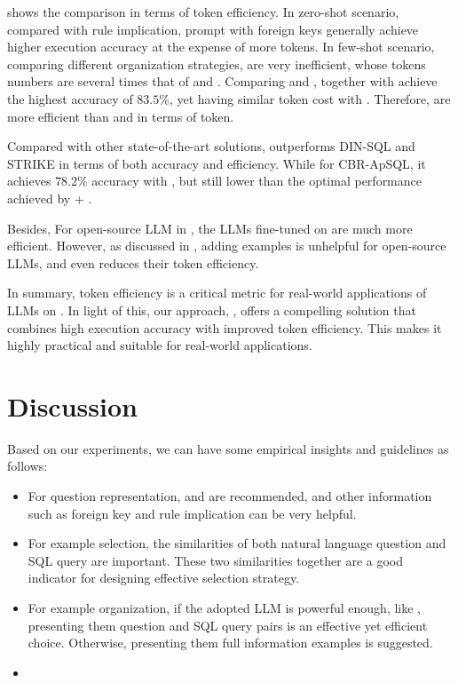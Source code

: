  shows the comparison in terms of token efficiency.
In zero-shot scenario, compared with rule implication, prompt with foreign keys generally achieve higher execution accuracy at the expense of more tokens. 
In few-shot scenario, comparing different organization strategies, \abfiorg are very inefficient, whose tokens numbers are several times that of \abpairorg and \absqlorg. 
Comparing \abpairorg and \absqlorg, \abpairorg together with \gptfour achieve the highest accuracy of $83.5\%$, yet having similar token cost with \absqlorg. 
Therefore, \abpairorg are more efficient than \absqlorg and \abfiorg in terms of token.

Compared with other state-of-the-art solutions, \ours outperforms DIN-SQL and STRIKE in terms of both accuracy and efficiency. 
While for CBR-ApSQL, it achieves $78.2\%$ accuracy with \davinci, but still lower than the optimal performance achieved by \abpqsselector + \abfiorg. 

Besides, For open-source LLM in , the LLMs fine-tuned on \nlsql are much more efficient. 
However, as discussed in , adding examples is unhelpful for open-source LLMs, and even reduces their token efficiency.

In summary, token efficiency is a critical metric for real-world applications of LLMs on \nlsql. In light of this, our approach, \ours, offers a compelling solution that combines high execution accuracy with improved token efficiency. This makes it highly practical and suitable for real-world applications.
\section{Discussion}
\label{sec:discussion}
Based on our experiments, we can have some empirical insights and guidelines as follows:
\begin{itemize}
    \item For question representation, \sqlprompt and \openaiprompt are recommended, and other information such as foreign key and rule implication can be very helpful. 
    
    \item For example selection, the similarities of both natural language question and SQL query are important. 
    These two similarities together are a good indicator for designing effective selection strategy.
    
    \item For example organization, if the adopted LLM is powerful enough, like \gptfour, presenting them question and SQL query pairs is an effective yet efficient choice. 
    Otherwise, presenting them full information examples is suggested. 
    
    \item {}
\end{itemize}


